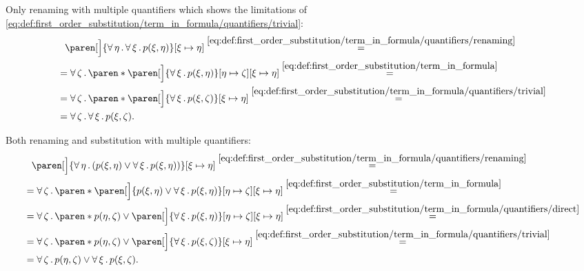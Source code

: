 \begin{example}
\begin{exenum}
     Only renaming with multiple quantifiers which shows the limitations of \eqref{eq:def:first_order_substitution/term_in_formula/quantifiers/trivial}:
    \begin{align*}
      &{}\phantom{=}{}
      \paren[\Big]{\qforall{\eta} \qforall{\xi} p(\xi, \eta)}[\xi \mapsto \eta]
      \overset {\eqref{eq:def:first_order_substitution/term_in_formula/quantifiers/renaming}} = \\ &=
      \qforall{\zeta} \paren*{ \paren[\Big]{ \qforall{\xi} p(\xi, \eta) }[\eta \mapsto \zeta][\xi \mapsto \eta]}
      \overset {\eqref{eq:def:first_order_substitution/term_in_formula}} = \\ &=
      \qforall{\zeta} \paren*{ \paren[\Big]{ \qforall{\xi} p(\xi, \zeta) }[\xi \mapsto \eta]}
      \overset {\eqref{eq:def:first_order_substitution/term_in_formula/quantifiers/trivial}} = \\ &=
      \qforall{\zeta} \qforall{\xi} p(\xi, \zeta).
    \end{align*}

     Both renaming and substitution with multiple quantifiers:
    \begin{align*}
      &{}\phantom{=}{}
      \paren[\Big]{ \qforall{\eta} (p(\xi, \eta) \vee \qforall{\xi} p(\xi, \eta)) }[\xi \mapsto \eta]
      \overset {\eqref{eq:def:first_order_substitution/term_in_formula/quantifiers/renaming}} = \\ &=
      \qforall{\zeta} \paren*{ \paren[\Big]{ p(\xi, \eta) \vee \qforall{\xi} p(\xi, \eta) }[\eta \mapsto \zeta][\xi \mapsto \eta] }
      \overset {\eqref{eq:def:first_order_substitution/term_in_formula}} = \\ &=
      \qforall{\zeta} \paren*{ p(\eta, \zeta) \vee \paren[\Big]{ \qforall{\xi} p(\xi, \eta) }[\eta \mapsto \zeta][\xi \mapsto \eta] }
      \overset {\eqref{eq:def:first_order_substitution/term_in_formula/quantifiers/direct}} = \\ &=
      \qforall{\zeta} \paren*{ p(\eta, \zeta) \vee \paren[\Big]{ \qforall{\xi} p(\xi, \zeta) }[\xi \mapsto \eta] }
      \overset {\eqref{eq:def:first_order_substitution/term_in_formula/quantifiers/trivial}} = \\ &=
      \qforall{\zeta} p(\eta, \zeta) \vee \qforall{\xi} p(\xi, \zeta).
    \end{align*}


\end{exenum}
\end{example}

